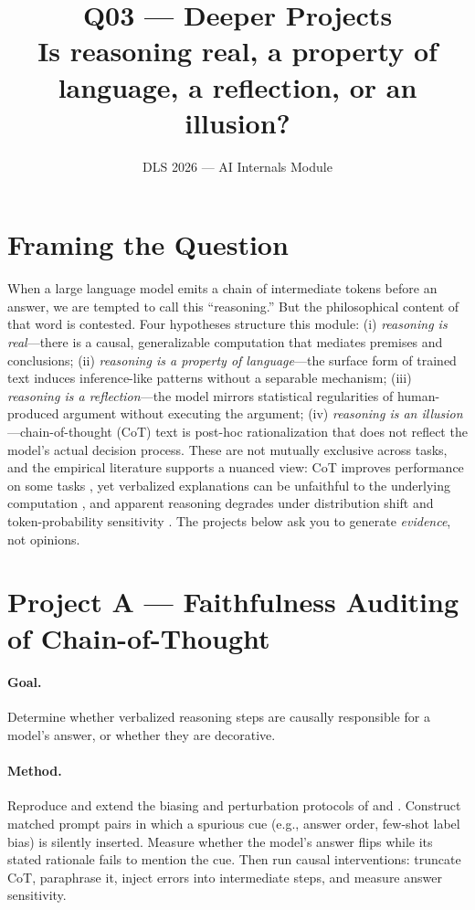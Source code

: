 \documentclass[11pt]{article}
\title{Q03 --- Deeper Projects\\\large Is reasoning real, a property of language, a reflection, or an illusion?}
\author{DLS 2026 --- AI Internals Module}
\date{}
\begin{document}
\maketitle

\section*{Framing the Question}

When a large language model emits a chain of intermediate tokens before an
answer, we are tempted to call this ``reasoning.'' But the philosophical
content of that word is contested. Four hypotheses structure this module:
(i) \emph{reasoning is real}---there is a causal, generalizable computation
that mediates premises and conclusions; (ii) \emph{reasoning is a property
of language}---the surface form of trained text induces inference-like
patterns without a separable mechanism; (iii) \emph{reasoning is a
reflection}---the model mirrors statistical regularities of human-produced
argument without executing the argument; (iv) \emph{reasoning is an
illusion}---chain-of-thought (CoT) text is post-hoc rationalization that
does not reflect the model's actual decision process. These are not mutually
exclusive across tasks, and the empirical literature supports a nuanced
view: CoT improves performance on some tasks \citep{wei2022cot,
nye2021scratchpad}, yet verbalized explanations can be unfaithful to the
underlying computation \citep{turpin2023language, lanham2023measuring}, and
apparent reasoning degrades under distribution shift and token-probability
sensitivity \citep{mccoy2023embers}. The projects below ask you to generate
\emph{evidence}, not opinions.

\section{Project A --- Faithfulness Auditing of Chain-of-Thought}

\paragraph{Goal.} Determine whether verbalized reasoning steps are causally
responsible for a model's answer, or whether they are decorative.

\paragraph{Method.} Reproduce and extend the biasing and perturbation
protocols of \citet{turpin2023language} and \citet{lanham2023measuring}.
Construct matched prompt pairs in which a spurious cue (e.g., answer order,
few-shot label bias) is silently inserted. Measure whether the model's
answer flips while its stated rationale fails to mention the cue. Then run
causal interventions: truncate CoT, paraphrase it, inject errors into
intermediate steps, and measure answer sensitivity.
\end{document}
